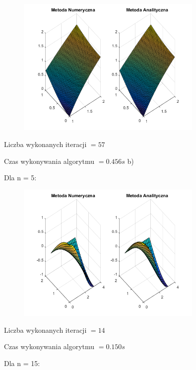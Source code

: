 \begin{figure}[!ht]
	\begin{center}
		\includegraphics[width=0.8\textwidth]{Lab6/charts/pr/zad1/50.png}
	\end{center}
\end{figure}

Liczba wykonanych iteracji $ = 57 $

Czas wykonywania algorytmu $ = 0.456 s$
\newpage
b)

Dla n = 5:

\begin{figure}[!ht]
	\begin{center}
		\includegraphics[width=0.8\textwidth]{Lab6/charts/pr/zad2/5.png}
	\end{center}
\end{figure}

Liczba wykonanych iteracji $ = 14 $

Czas wykonywania algorytmu $ = 0.150 s$

Dla n = 15:

